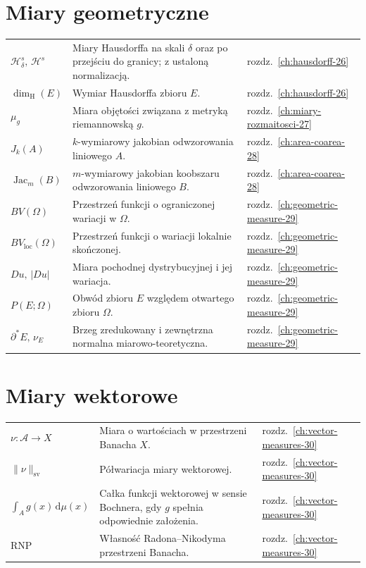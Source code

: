 \documentclass[11pt,a4paper,oneside]{book}
\numberwithin{equation}{chapter}
\theoremstyle{plain}
\theoremstyle{definition}
\theoremstyle{remark}
\begin{document}
\section*{Miary geometryczne}
\begin{longtable}{@{}p{}p{}p{}@{}}
$\mathcal H^s_\delta,\,\mathcal H^s$ & Miary Hausdorffa na skali $\delta$ oraz po przejściu do granicy; z ustaloną normalizacją. & rozdz.~\ref{ch:hausdorff-26} \\
$\dim_{\mathrm H}(E)$ & Wymiar Hausdorffa zbioru $E$. & rozdz.~\ref{ch:hausdorff-26} \\
$\mu_g$ & Miara objętości związana z metryką riemannowską $g$. & rozdz.~\ref{ch:miary-rozmaitosci-27} \\
$J_k(A)$ & $k$-wymiarowy jakobian odwzorowania liniowego $A$. & rozdz.~\ref{ch:area-coarea-28} \\
$\operatorname{Jac}_m(B)$ & $m$-wymiarowy jakobian koobszaru odwzorowania liniowego $B$. & rozdz.~\ref{ch:area-coarea-28} \\
$BV(\Omega)$ & Przestrzeń funkcji o ograniczonej wariacji w $\Omega$. & rozdz.~\ref{ch:geometric-measure-29} \\
$BV_{\mathrm{loc}}(\Omega)$ & Przestrzeń funkcji o wariacji lokalnie skończonej. & rozdz.~\ref{ch:geometric-measure-29} \\
$Du,\,|Du|$ & Miara pochodnej dystrybucyjnej i jej wariacja. & rozdz.~\ref{ch:geometric-measure-29} \\
$P(E;\Omega)$ & Obwód zbioru $E$ względem otwartego zbioru $\Omega$. & rozdz.~\ref{ch:geometric-measure-29} \\
$\partial^*E,\,\nu_E$ & Brzeg zredukowany i zewnętrzna normalna miarowo-teoretyczna. & rozdz.~\ref{ch:geometric-measure-29} \\
\end{longtable}

\section*{Miary wektorowe}
\begin{longtable}{@{}p{}p{}p{}@{}}
$\nu:\mathcal A\to X$ & Miara o wartościach w przestrzeni Banacha $X$. & rozdz.~\ref{ch:vector-measures-30} \\
$\|\nu\|_{\mathrm{sv}}$ & Półwariacja miary wektorowej. & rozdz.~\ref{ch:vector-measures-30} \\
$\int_A g(x)\,\mathrm d\mu(x)$ & Całka funkcji wektorowej w sensie Bochnera, gdy $g$ spełnia odpowiednie założenia. & rozdz.~\ref{ch:vector-measures-30} \\
$\mathrm{RNP}$ & Własność Radona--Nikodyma przestrzeni Banacha. & rozdz.~\ref{ch:vector-measures-30} \\
\end{longtable}
\end{document}
